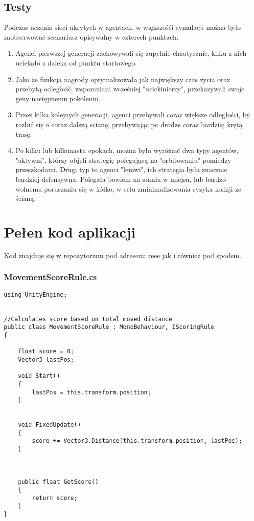 \documentclass[12pt,a4paper]{article}
\begin{document}
\subsection*{Testy}
Podczas uczenia sieci ukrytych w agentach, w większośći symulacji można było zaobserwować scenariusz opisywalny w czterech punktach.
\begin{enumerate}
\item Agenci pierwszej generacji zachowywali się zupełnie chaotycznie, kilku z nich uciekało z daleka od punktu startowego.
\item Jako że funkcja nagrody optymalizowała jak największy czas życia oraz przebytą odległość, wspomniani wcześniej "uciekinierzy", przekazywali swoje geny następnemu pokoleniu.
\item Przez kilka kolejnych generacji, agenci przebywali coraz większe odległości, by rozbić się o coraz dalszą scianę, przebywając po drodze coraz bardziej krętą trasę.
\item Po kilku lub kilkunastu epokach, można było wyróżnić dwa typy agentów, "aktywni", którzy objęli strategię polegającą na "orbitowaniu" pomiędzy przeszkodami. Drugi typ to agenci "leniwi", ich strategia była znacznie bardziej defensywna. Polegała bowiem na staniu w miejsu, lub bardzo wolnemu poruszaniu się w kółko, w celu zminimalizowania ryzyka kolizji ze ścianą.

\end{enumerate}

\newpage
\section*{Pełen kod aplikacji}
Kod znajduje się w repozytorium pod adresem: reee
jak i również pod spodem.



\subsubsection*{MovementScoreRule.cs}
\begin{lstlisting}
using UnityEngine;


//Calculates score based on total moved distance
public class MovementScoreRule : MonoBehaviour, IScoringRule
{

    float score = 0;
    Vector3 lastPos;

    void Start()
    {
        lastPos = this.transform.position;
    }


    void FixedUpdate()
    {
        score += Vector3.Distance(this.transform.position, lastPos);
    }



    public float GetScore()
    {
        return score;
    }
}\end{lstlisting}
\pagebreak
\end{document}
